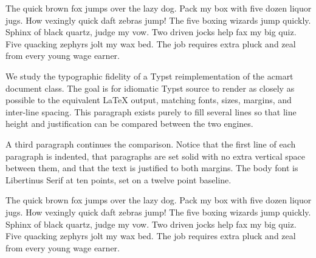 \documentclass[acmsmall,nonacm]{acmart}
\begin{document}
The quick brown fox jumps over the lazy dog. Pack my box with five dozen
liquor jugs. How vexingly quick daft zebras jump! The five boxing wizards
jump quickly. Sphinx of black quartz, judge my vow. Two driven jocks help
fax my big quiz. Five quacking zephyrs jolt my wax bed. The job requires
extra pluck and zeal from every young wage earner.

We study the typographic fidelity of a Typst reimplementation of the acmart
document class. The goal is for idiomatic Typst source to render as closely
as possible to the equivalent LaTeX output, matching fonts, sizes, margins,
and inter-line spacing. This paragraph exists purely to fill several lines so
that line height and justification can be compared between the two engines.

A third paragraph continues the comparison. Notice that the first line of each
paragraph is indented, that paragraphs are set solid with no extra vertical
space between them, and that the text is justified to both margins. The body
font is Libertinus Serif at ten points, set on a twelve point baseline.

The quick brown fox jumps over the lazy dog. Pack my box with five dozen
liquor jugs. How vexingly quick daft zebras jump! The five boxing wizards
jump quickly. Sphinx of black quartz, judge my vow. Two driven jocks help
fax my big quiz. Five quacking zephyrs jolt my wax bed. The job requires
extra pluck and zeal from every young wage earner.
\end{document}
